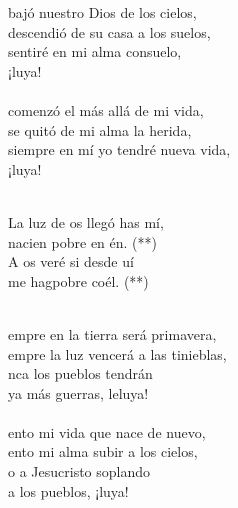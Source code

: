 \begin{cancion}%
	 bajó nuestro Dios de los cielos, \\
	 descendió de su casa a los suelos,\\
	 sentiré en mi alma consuelo, \\
	¡luya! \\
\jump\\
	 comenzó el más allá de mi vida, \\
	 se quitó de mi alma la herida,\\
	 siempre en mí yo tendré nueva vida,\\
	¡luya! \\\jump\\
	\begin{chorus}%
	La luz de os llegó has mí, \\
	nacien pobre en én. (**)\\
	A os veré si desde uí \\
	me hagpobre coél. (**)\\
	\end{chorus}%
	\jump\\
	empre en la tierra será primavera, \\
	empre la luz vencerá a las tinieblas,\\
	nca los pueblos tendrán \\
	ya más guerras, leluya!\\
\jump\\
	ento mi vida que nace de nuevo, \\
	ento mi alma subir a los cielos,\\
	o a Jesucristo soplando \\
	a los pueblos, ¡luya! \\
\end{cancion}%

